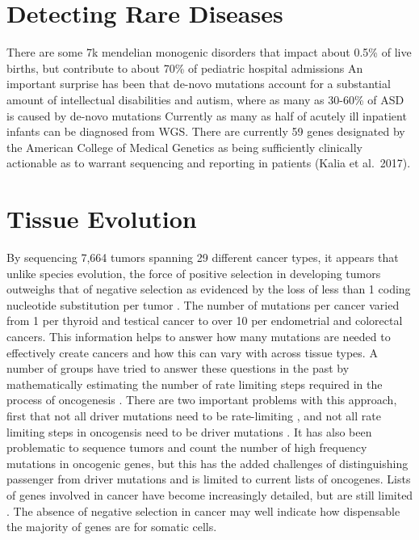 \documentclass[]{book}
\begin{document}
\hypertarget{detecting-rare-diseases}{%
\section{Detecting Rare Diseases}\label{detecting-rare-diseases}}

There are some 7k mendelian monogenic disorders that impact about 0.5\% of live births, but contribute to about 70\% of pediatric hospital admissions
An important surprise has been that de-novo mutations account for a substantial amount of intellectual disabilities and autism, where as many as 30-60\% of ASD is caused by de-novo mutations
Currently as many as half of acutely ill inpatient infants can be diagnosed from WGS.
There are currently 59 genes designated by the American College of Medical Genetics as being sufficiently clinically actionable as to warrant sequencing and reporting in patients (Kalia et al.~2017).

\hypertarget{tissue-evolution}{%
\section{Tissue Evolution}\label{tissue-evolution}}

By sequencing 7,664 tumors spanning 29 different cancer types, it appears that unlike species evolution, the force of positive selection in developing tumors outweighs that of negative selection as evidenced by the loss of less than 1 coding nucleotide substitution per tumor \citep{martincorena2017universal}. The number of mutations per cancer varied from 1 per thyroid and testical cancer to over 10 per endometrial and colorectal cancers. This information helps to answer how many mutations are needed to effectively create cancers and how this can vary with across tissue types. A number of groups have tried to answer these questions in the past by mathematically estimating the number of rate limiting steps required in the process of oncogenesis \citep{armitage1954age, tomasetti2015variation}. There are two important problems with this approach, first that not all driver mutations need to be rate-limiting \citep{yates2015subclonal}, and not all rate limiting steps in oncogensis need to be driver mutations \citep{martincorena2015high}. It has also been problematic to sequence tumors and count the number of high frequency mutations in oncogenic genes, but this has the added challenges of distinguishing passenger from driver mutations and is limited to current lists of oncogenes. Lists of genes involved in cancer have become increasingly detailed, but are still limited \citep{lawrence2014discovery, kandoth2013mutational}. The absence of negative selection in cancer may well indicate how dispensable the majority of genes are for somatic cells.
\end{document}

